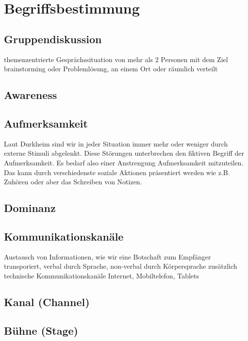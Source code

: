 \documentclass{seminarvorlage}
\begin{document}

\section{Begriffsbestimmung}
\subsection{Gruppendiskussion}
themenzentrierte Gesprächssituation von mehr als 2 Personen mit dem Ziel
brainstorming oder Problemlösung, an einem Ort oder räumlich verteilt
\subsection{Awareness}

\subsection{Aufmerksamkeit}
Laut Durkheim sind wir in jeder Situation immer mehr oder weniger durch externe
Stimuli abgelenkt. Diese Störungen unterbrechen den fiktiven Begriff der
Aufmerksamkeit. Es bedarf also einer Anstrengung Aufmerksamkeit mitzuteilen. Das
kann durch verschiedenste soziale Aktionen präsentiert werden wie z.B. Zuhören
oder aber das Schreiben von Notizen.

\subsection{Dominanz}

\subsection{Kommunikationskanäle}
Austausch von Informationen, wie wir eine Botschaft zum Empfänger transporiert,
verbal durch Sprache, non-verbal durch Körpersprache
zusätzlich technische Kommunikationskanäle Internet, Mobiltelefon, Tablets
\subsection{Kanal (Channel)}
\subsection{Bühne (Stage)}
\end{document}
